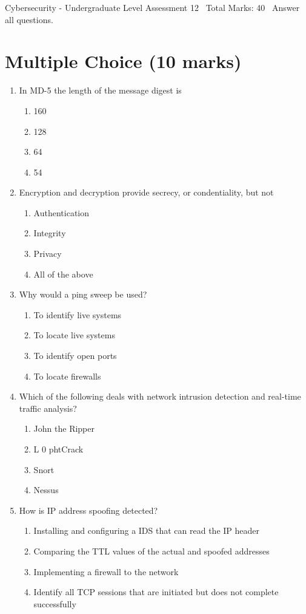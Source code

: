 \documentclass[12pt]{article}
\begin{document}
\begin{center}
Cybersecurity - Undergraduate Level Assessment 12 \
Total Marks: 40 \
Answer all questions.
\end{center}

\section*{Multiple Choice (10 marks)}
\begin{enumerate}[label=\arabic*.]
\item In MD-5 the length of the message digest is
\begin{enumerate}[label=(\alph*)]
    \item 160
    \item 128
    \item 64
    \item 54
\end{enumerate}
\item Encryption and decryption provide secrecy, or condentiality, but not
\begin{enumerate}[label=(\alph*)]
    \item Authentication
    \item Integrity
    \item Privacy
    \item All of the above
\end{enumerate}
\item Why would a ping sweep be used?
\begin{enumerate}[label=(\alph*)]
    \item To identify live systems
    \item To locate live systems
    \item To identify open ports
    \item To locate firewalls
\end{enumerate}
\item Which of the following deals with network intrusion detection and real-time traffic analysis?
\begin{enumerate}[label=(\alph*)]
    \item John the Ripper
    \item L 0 phtCrack
    \item Snort
    \item Nessus
\end{enumerate}
\item How is IP address spoofing detected?
\begin{enumerate}[label=(\alph*)]
    \item Installing and configuring a IDS that can read the IP header
    \item Comparing the TTL values of the actual and spoofed addresses
    \item Implementing a firewall to the network
    \item Identify all TCP sessions that are initiated but does not complete successfully
\end{enumerate}
\end{enumerate}
\end{document}
